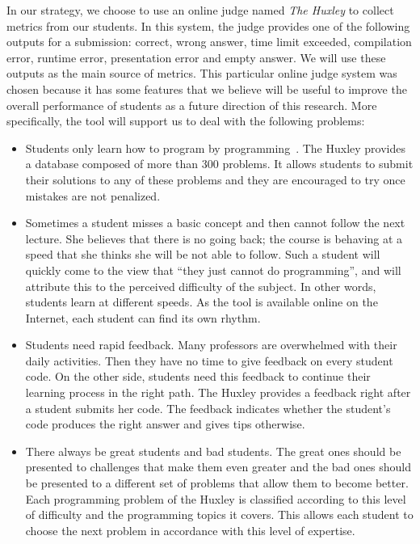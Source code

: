 In our strategy, we choose to use an online judge named \emph{The Huxley} \cite{paes2013ferramenta} to collect metrics from our students. In this system, the judge provides one of the following outputs for a submission: correct, wrong answer, time limit exceeded, compilation error, runtime error, presentation error and empty answer. We will use these outputs as the main source of metrics. This particular online judge system was chosen because it has some features that we believe will be useful to improve the overall performance of students as a future direction of this research. More specifically, the tool will support us to deal with the following problems:
\begin{itemize}
  \item Students only learn how to program by programming~\cite{jenkins-ltsn02}. The Huxley provides a database composed of more than 300 problems. It allows students to submit their solutions to any of these problems and they are encouraged to try once mistakes are not penalized.
  \item Sometimes a student misses a basic concept and then cannot follow the next lecture. She believes that there is no going back; the course is behaving at a speed that she thinks she will be not able to follow. Such a student will quickly come to the view that ``they just cannot do programming'', and will attribute this to the perceived difficulty of the subject. In other words, students learn at different speeds. As the tool is available online on the Internet, each student can find its own rhythm.
  \item Students need rapid feedback. Many professors are overwhelmed with their daily activities. Then they have no time to give feedback on every student code. On the other side, students need this feedback to continue their learning process in the right path. The Huxley provides a feedback right after a student submits her code. The feedback indicates whether the student's code produces the right answer and gives tips otherwise.
  \item There always be great students and bad students. The great ones should be presented to challenges that make them even greater and the bad ones should be presented to a different set of problems that allow them to become better. Each programming problem of the Huxley is classified according to this level of difficulty and the programming topics it covers. This allows each student to choose the next problem in accordance with this level of expertise.
\end{itemize}

